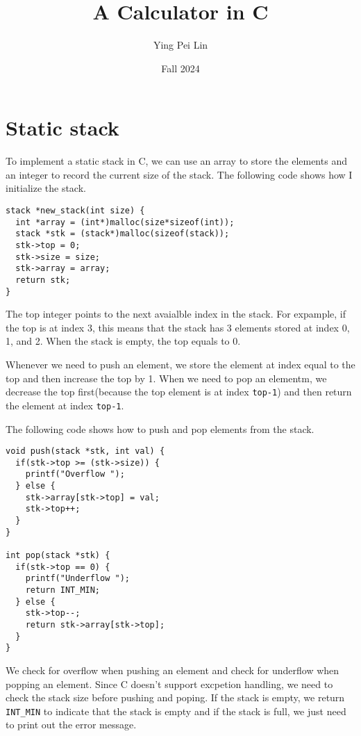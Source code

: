 \documentclass[a4paper,11pt]{article}
\begin{document}
\title{
    \textbf{A Calculator in C}
}
\author{Ying Pei Lin}
\date{Fall 2024}

\maketitle

\section*{Static stack}

To implement a static stack in C, we can use an array to store the elements and an integer to record
the current size of the stack. The following code shows how I initialize the stack. 

\begin{verbatim}
stack *new_stack(int size) {
  int *array = (int*)malloc(size*sizeof(int));
  stack *stk = (stack*)malloc(sizeof(stack));
  stk->top = 0;
  stk->size = size;
  stk->array = array;
  return stk;
}
\end{verbatim}

The top integer points to the next avaialble index in the stack. For expample, if the top is 
at index 3, this means that the stack has 3 elements stored at index 0, 1, and 2. When the stack
is empty, the top equals to 0. 

Whenever we need to push an element, we store the element at index equal to the top and then
increase the top by 1. When we need to pop an elementm, we decrease the top first(because the top
element is at index {\tt top-1}) and then return the element at index {\tt top-1}.

The following code shows how to push and pop elements from
the stack.

\begin{verbatim}
void push(stack *stk, int val) {
  if(stk->top >= (stk->size)) {
    printf("Overflow ");
  } else {
    stk->array[stk->top] = val;
    stk->top++;
  }
}

int pop(stack *stk) {
  if(stk->top == 0) {
    printf("Underflow ");
    return INT_MIN;
  } else {
    stk->top--;
    return stk->array[stk->top];
  }
}
\end{verbatim}

We check for overflow when pushing an element and check for underflow when popping an element.
Since C doesn't support excpetion handling, we need to check the stack size before pushing 
and poping. If the stack is empty, we return {\tt INT\_MIN} to indicate that the stack is empty and
if the stack is full, we just need to print out the error message.
\end{document}
